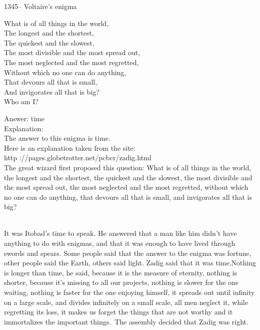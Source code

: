 \documentclass[letterpaper, 12pt]{article}
\begin{document}
1345-- Voltaire's enigma\\
\begin{center}{What is of all things in the world,\\
The longest and the shortest,\\
The quickest and the slowest,\\
The most divisible and the most spread out,\\
The most neglected and the most regretted,\\
Without which no one can do anything,\\
That devours all that is small,\\
And invigorates all that is big?\\
Who am I?\\}
\end{center}

Answer: time\\

Explanation: \\
The answer to this enigma is time.  \\
Here is an explanation taken from the site:\\
http ://pages.globetrotter.net/pcbcr/zadig.html\\

The great wizard first proposed this question: \og What is of all
things in the world, the longest and the shortest, the quickest and
the slowest, the most divisible and the most spread out, the most
neglected and the most regretted, without which no one can do
anything, that devours all that is small,
and invigorates all that is big?\fg\\\

It was Itobad's time to speak. He answered that a man like him
didn't have anything to do with enigmas, and that it was enough to
have lived through swords and spears. Some people said that the
answer to the enigma was fortune, other people said the Earth,
others said light. Zadig said that it was time.\og Nothing is longer
than time, he said, because it is the measure of eternity, nothing
is shorter, because it's missing to all our projects, nothing is
slower for the one waiting, nothing is faster for the one enjoying
himself, it spreads out until infinity on a large scale, and divides
infinitely on a small scale, all men neglect it, while regretting
its loss, it makes us forget the things that are not worthy and it
immortalizes the important things.\fg\
The assembly decided that Zadig was right.\\
\end{document}
